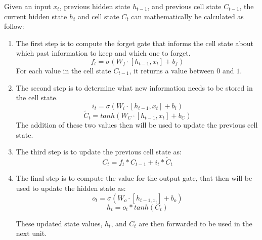 Given an input $x_t$, previous hidden state $h_{t-1}$, and previous cell state $C_{t-1}$, the current hidden state $h_t$ and cell state $C_t$ can mathematically be calculated as follow:

\begin{enumerate}
    \item The first step is to compute the forget gate that informs the cell state about which past information to keep       and which one to forget.
        \begin{equation}
            \label{eqn:forget_gate}
            f_t = \sigma(W_f \cdot [h_{t-1}, x_t] + b_f)
        \end{equation}
        For each value in the cell state $C_{t-1}$, it returns a value between $0$ and $1$.
        
    \item The second step is to determine what new information needs to be stored in the cell state.
        \begin{equation}
            \label{eqn:input_gate}
            i_t = \sigma(W_i \cdot [h_{t-1}, x_t] + b_i)
        \end{equation}
        \begin{equation}
            \widetilde{C} _t = tanh(W_C \cdot [h_{t-1}, x_t] + b_C)
        \end{equation}
        The addition of these two values then will be used to update the previous cell state.
        
    \item The third step is to update the previous cell state as:
        \begin{equation}
            C_t = f_t * C_{t-1} + i_t * \widetilde{C}_t
        \end{equation}
        
    \item The final step is to compute the value for the output gate, that then will be used to update the hidden state       as:
        \begin{equation}
            \label{eqn:output_gate}
            o_t = \sigma(W_o \cdot [h_{t-1, x_t}] + b_o)
        \end{equation}
        \begin{equation}
            h_t = o_t * tanh(C_t)
        \end{equation}
    
    These updated state values, $h_t$, and $C_t$ are then forwarded to be used in the next unit.
\end{enumerate}

